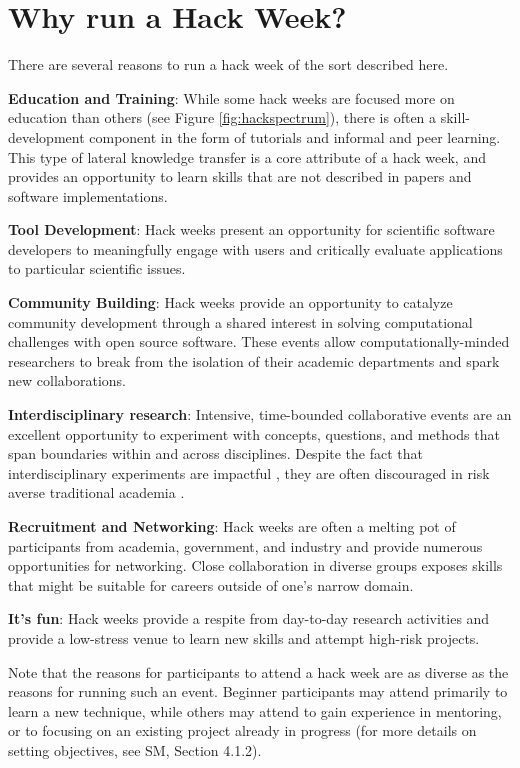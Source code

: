 \section*{Why run a Hack Week?}

There are several reasons to run a hack week of the sort described here.

\noindent\textbf{Education and Training}: While some hack weeks are focused more on education than others (see Figure \ref{fig:hackspectrum}), there is often a skill-development component in the form of tutorials and informal and peer learning. This type of lateral knowledge transfer \cite{b:wilson-swc-lessons-2016} is a core attribute of a hack week, and provides an opportunity to learn skills that are not described in papers and software implementations.

\noindent\textbf{Tool Development}: Hack weeks present an opportunity for scientific software developers to meaningfully engage with users and critically evaluate applications to particular scientific issues.

\noindent\textbf{Community Building}: Hack weeks provide an opportunity to catalyze community development through a shared interest in solving computational challenges with open source software. These events allow computationally-minded researchers to break from the isolation of their academic departments and spark new collaborations.

\noindent\textbf{Interdisciplinary research}: Intensive, time-bounded collaborative events are an excellent opportunity to experiment with concepts, questions, and methods that span boundaries within and across disciplines. Despite the fact that interdisciplinary experiments are impactful \cite{Hall2012-hi}, they are often discouraged in risk averse traditional academia \cite{Sung2003-go}.

\noindent\textbf{Recruitment and Networking}: Hack weeks are often a melting pot of participants from academia, government, and industry and provide numerous opportunities for networking. Close collaboration in diverse groups exposes skills that might be suitable for careers outside of one's narrow domain.

\noindent\textbf{It's fun}: Hack weeks provide a respite from day-to-day research activities and provide a low-stress venue to learn new skills and attempt high-risk projects.

\noindent Note that the reasons for participants to attend a hack week are as diverse as the reasons for running such an event.
Beginner participants may attend primarily to learn a new technique, while others may attend to gain experience in mentoring, or to focusing on an existing project already in progress (for more details on setting objectives, see SM, Section 4.1.2).
